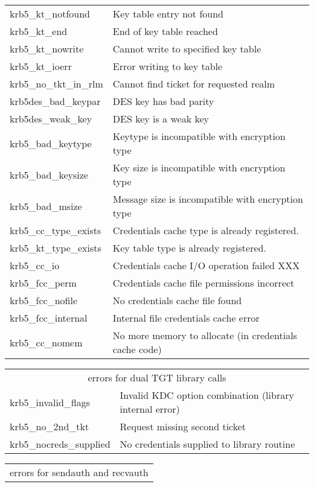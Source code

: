 \begin{small}
\begin{tabular}{ll}
{\sc krb5_kt_notfound }&	 Key table entry not found \\
{\sc krb5_kt_end }&		 End of key table reached \\
{\sc krb5_kt_nowrite }&	 Cannot write to specified key table \\
{\sc krb5_kt_ioerr }&	 Error writing to key table \\
{\sc krb5_no_tkt_in_rlm }&	 Cannot find ticket for requested realm \\
{\sc krb5des_bad_keypar }&	 DES key has bad parity \\
{\sc krb5des_weak_key }&	 DES key is a weak key \\
{\sc krb5_bad_keytype }&	 Keytype is incompatible with encryption type \\
{\sc krb5_bad_keysize }&	 Key size is incompatible with encryption type \\
{\sc krb5_bad_msize }&	 Message size is incompatible with encryption type \\
{\sc krb5_cc_type_exists }&	 Credentials cache type is already registered. \\
{\sc krb5_kt_type_exists }&	 Key table type is already registered. \\
{\sc krb5_cc_io }&		 Credentials cache I/O operation failed XXX \\
{\sc krb5_fcc_perm }&	 Credentials cache file permissions incorrect \\
{\sc krb5_fcc_nofile }&	 No credentials cache file found \\
{\sc krb5_fcc_internal }&	 Internal file credentials cache error \\
{\sc krb5_cc_nomem }& \parbox[t]{3in}{No more memory to allocate (in credentials cache code)}\\ 
\end{tabular}

\begin{tabular}{ll}
\multicolumn{2}{c}{errors for dual TGT library calls} \\

{\sc krb5_invalid_flags }& Invalid KDC option combination (library internal error) \\
{\sc krb5_no_2nd_tkt }&	 Request missing second ticket \\
{\sc krb5_nocreds_supplied }& No credentials supplied to library routine \\

\end{tabular}

\begin{tabular}{ll}
\multicolumn{2}{c}{errors for sendauth and recvauth} \\


\end{tabular}
\end{small}
